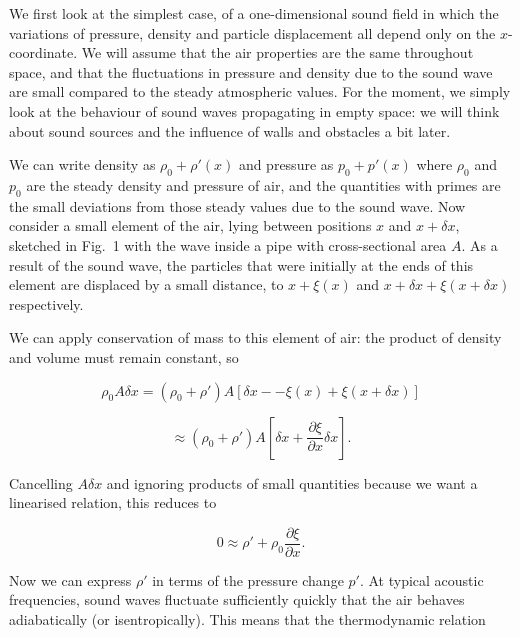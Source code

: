   We first look at the simplest case, of a one-dimensional sound field in which 
  the variations of pressure, density and particle displacement all depend only 
  on the $x$-coordinate. We will assume that the air properties are the same 
  throughout space, and that the fluctuations in pressure and density due to 
  the sound wave are small compared to the steady atmospheric values. For the 
  moment, we simply look at the behaviour of sound waves propagating in empty 
  space: we will think about sound sources and the influence of walls and 
  obstacles a bit later. 

  We can write density as $\rho_0 + \rho'(x)$ and pressure as $p_0 + p'(x)$ 
  where $\rho_0$ and $p_0$ are the steady density and pressure of air, and the 
  quantities with primes are the small deviations from those steady values due 
  to the sound wave. Now consider a small element of the air, lying between 
  positions $x$ and $x+\delta x$, sketched in Fig.\ 1 with the wave inside a 
  pipe with cross-sectional area $A$. As a result of the sound wave, the 
  particles that were initially at the ends of this element are displaced by a 
  small distance, to $x+\xi(x)$ and $x + \delta x + \xi(x + \delta x)$ 
  respectively. 


  We can apply conservation of mass to this element of air: the product of 
  density and volume must remain constant, so 

  \begin{equation*}\rho_0 A \delta x = (\rho_0 + \rho') A [\delta x -- \xi(x) + 
  \xi(x+ \delta x)] \end{equation*} 

  \begin{equation*}\approx (\rho_0 + \rho') A \left[\delta x + \frac{\partial 
  \xi}{\partial x} \delta x \right] . \tag{1}\end{equation*} 

  Cancelling $A \delta x$ and ignoring products of small quantities because we 
  want a linearised relation, this reduces to 

  \begin{equation*}0 \approx \rho' + \rho_0 \frac{\partial \xi}{\partial x} 
  .\tag{2}\end{equation*} 

  Now we can express $\rho'$ in terms of the pressure change $p'$. At typical 
  acoustic frequencies, sound waves fluctuate sufficiently quickly that the air 
  behaves adiabatically (or isentropically). This means that the thermodynamic 
  relation 

